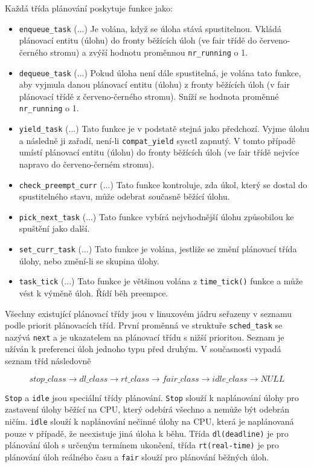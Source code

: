\documentclass[
  field=ainfk,
  biblatex,
  glossaries,
  index
]{kidiplom}
\begin{document}
\newpage
\noindent
Každá třída plánování poskytuje funkce jako:
\begin{itemize}
\item \verb#enqueue_task# (...) 
Je volána, když se úloha stává spustitelnou. Vkládá plánovací entitu (úlohu) do fronty běžících úloh (ve fair třídě do červeno-černého stromu) a zvýší hodnotu proměnnou \verb#nr_running# o 1.
\item \verb#dequeue_task# (...) 
Pokud úloha není dále spustitelná, je volána tato funkce, aby vyjmula danou plánovací entitu (úlohu) z fronty běžících úloh (v fair plánovací třídě z červeno-černého stromu). Sníží se hodnota proměnné \verb#nr_running# o 1.
\item \verb#yield_task# (...) 
Tato funkce je v podstatě stejná jako předchozí. Vyjme úlohu a následně ji zařadí, není-li \verb#compat_yield# sysctl zapnutý. V tomto případě umístí plánovací entitu (úlohu) do fronty běžících úloh (ve fair třídě nejvíce napravo do červeno-černém stromu).
\item \verb#check_preempt_curr# (...) 
Tato funkce kontroluje, zda úkol, který se dostal do spustitelného stavu, může odebrat současně běžící úlohu.
\item \verb#pick_next_task# (...) 
Tato funkce vybírá nejvhodnější úlohu způsobilou ke spuštění jako další.
\item \verb#set_curr_task# (...) 
Tato funkce je volána, jestliže se změní plánovací třída úlohy, nebo změní-li se skupina úlohy.
\item \verb#task_tick# (...) 
Tato funkce je většinou volána z \verb#time_tick()# funkce a může vést k výměně úloh. Řídí běh preempce. 
\end{itemize}

Všechny existující plánovací třídy jsou v linuxovém jádru seřazeny v seznamu podle priorit plánovacích tříd. První proměnná ve struktuře \verb#sched_task# se nazývá \verb#next# a je ukazatelem na plánovací třídu s nižší prioritou. Seznam je užíván k preferenci úloh jednoho typu před druhým. V současnosti vypadá seznam tříd následovně

$$ 
stop\_class \rightarrow dl\_class \rightarrow rt\_class \rightarrow fair\_class \rightarrow idle\_class \rightarrow NULL 
$$

\verb#Stop# a \verb#idle# jsou speciální třídy plánování. \verb#Stop# slouží k naplánování úlohy pro zastavení úlohy běžící na CPU, který odebírá všechno a nemůže být odebrán ničím. \verb#idle# slouží k naplánování nečinné úlohy na CPU, která je naplánovaná pouze v případě, že neexistuje jiná úloha k běhu. Třída \verb#dl(deadline)# je pro plánování úloh s určeným termínem ukončení, třída \verb#rt(real-time)# je pro plánování úloh reálného času a \verb#fair# slouží pro plánování běžných úloh.
\end{document}
